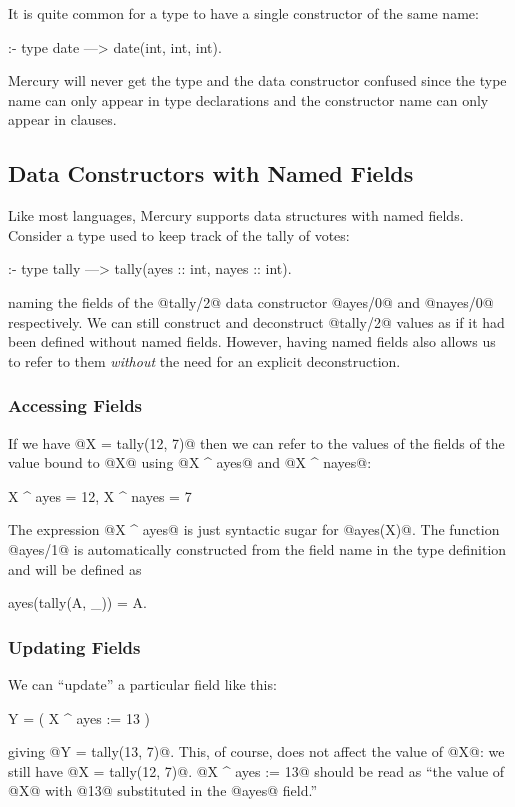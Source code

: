 It is quite common for a type to have a single constructor of the same
name:
\begin{myverbatim}
:- type date ---> date(int, int, int).  %
\end{myverbatim}
Mercury will never get the type and the data constructor confused since
the type name can only appear in type declarations and the constructor
name can only appear in clauses.

\subsection{Data Constructors with Named Fields}

Like most languages, Mercury supports data structures with named fields.
Consider a type used to keep track of the tally of votes:
\begin{myverbatim}
:- type tally ---> tally(ayes :: int, nayes :: int).
\end{myverbatim}
naming the fields of the @tally/2@ data constructor @ayes/0@ and
@nayes/0@ respectively.  We can still construct and deconstruct @tally/2@
values as if it had been defined without named fields.  However, having
named fields also allows us to refer to them \emph{without} the need for an
explicit deconstruction.

\subsubsection{Accessing Fields}

If we have @X = tally(12, 7)@ then we can refer to the values of the fields
of the value bound to @X@ using @X ^ ayes@ and @X ^ nayes@:
\begin{myverbatim}
    X ^ ayes  = 12,
    X ^ nayes =  7
\end{myverbatim}
The expression @X ^ ayes@ is just syntactic sugar for @ayes(X)@.  The
function @ayes/1@ is automatically constructed from the field name in the
type definition and will be defined as
\begin{myverbatim}
ayes(tally(A, _)) = A.
\end{myverbatim}

\subsubsection{Updating Fields}

We can ``update'' a particular field like this:
\begin{myverbatim}
    Y = ( X ^ ayes := 13 )
\end{myverbatim}
giving @Y = tally(13, 7)@.  This, of course, does not affect the value
of @X@: we still have @X = tally(12, 7)@.  
@X ^ ayes := 13@ should be read as ``the value of @X@ with @13@
substituted in the @ayes@ field.''


